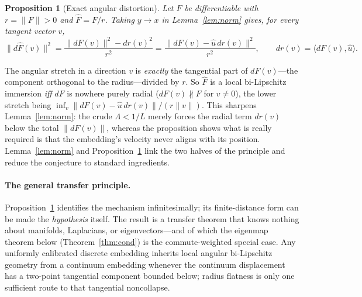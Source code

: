 \documentclass[11pt]{article}
\newtheorem{proposition}[theorem]{Proposition}
\theoremstyle{remark}
\begin{document}
\begin{proposition}[Exact angular distortion]\label{prop:angdist}
Let $F$ be differentiable with $r=\lVert F\rVert>0$ and $\hat F=F/r$. Taking
$y\to x$ in Lemma~\ref{lem:norm} gives, for every tangent vector $v$,
\[
\lVert d\hat F(v)\rVert^2=\frac{\lVert dF(v)\rVert^2-dr(v)^2}{r^2}
=\frac{\lVert dF(v)-\hat u\,dr(v)\rVert^2}{r^2},
\qquad dr(v)=\langle dF(v),\hat u\rangle .
\]
\end{proposition}

The angular stretch in a direction $v$ is \emph{exactly} the tangential part
of $dF(v)$---the component orthogonal to the radius---divided by $r$. So $\hat F$
is a local bi-Lipschitz immersion \emph{iff} $dF$ is nowhere purely radial
($dF(v)\not\parallel F$ for $v\neq0$), the lower stretch being
$\inf_{v}\lVert dF(v)-\hat u\,dr(v)\rVert/(r\lVert v\rVert)$. This sharpens
Lemma~\ref{lem:norm}: the crude $\Lambda<1/L$ merely forces the radial term
$dr(v)$ below the total $\lVert dF(v)\rVert$, whereas the proposition shows what is
really required is that the embedding's velocity never aligns with its position.
Lemma~\ref{lem:norm} and Proposition~\ref{prop:angdist} link the two halves of the
principle and reduce the conjecture to standard ingredients.

\paragraph{The general transfer principle.}
Proposition~\ref{prop:angdist} identifies the mechanism infinitesimally; its
finite-distance form can be made the \emph{hypothesis} itself. The result is a
transfer theorem that knows nothing about manifolds, Laplacians, or
eigenvectors---and of which the eigenmap theorem below
(Theorem~\ref{thm:cond}) is the commute-weighted special case. Any uniformly
calibrated discrete embedding inherits local angular bi-Lipschitz geometry
from a continuum embedding whenever the continuum displacement has a two-point
tangential component bounded below; radius flatness is only one sufficient
route to that tangential noncollapse.
\end{document}
